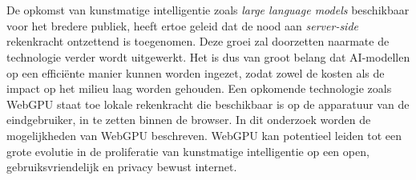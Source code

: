 
%
%
%
%
%

%



\chapter*{}

De opkomst van kunstmatige intelligentie zoals \textit{large language models} beschikbaar voor het bredere publiek, heeft ertoe geleid dat de nood aan \textit{server-side} rekenkracht ontzettend is toegenomen. Deze groei zal doorzetten naarmate de technologie verder wordt uitgewerkt. Het is dus van groot belang dat AI-modellen op een efficiënte manier kunnen worden ingezet, zodat zowel de kosten als de impact op het milieu laag worden gehouden. Een opkomende technologie zoals WebGPU staat toe lokale rekenkracht die beschikbaar is op de apparatuur van de eindgebruiker, in te zetten binnen de browser. In dit onderzoek worden de mogelijkheden van WebGPU beschreven. WebGPU kan potentieel leiden tot een grote evolutie in de proliferatie van kunstmatige intelligentie op een open, gebruiksvriendelijk en privacy bewust internet.

